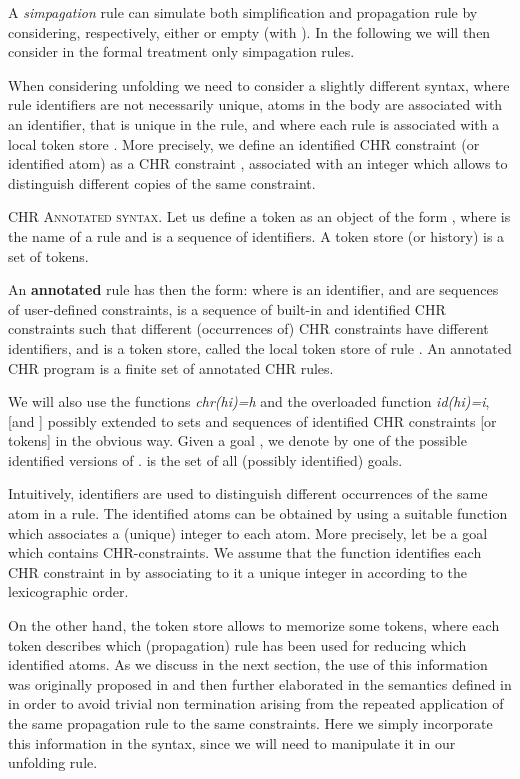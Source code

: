 \documentclass[final]{acmtrans2e}
\begin{document}
A  \emph{simpagation} rule can simulate both simplification and
propagation rule by considering, respectively, either  or
 empty (with ). In the following we
will then consider in the formal treatment only simpagation rules.

When considering unfolding we need to consider a slightly
different syntax,  where rule identifiers are not necessarily
unique, atoms in the body are associated with an identifier,
that is unique in the rule, and
where each rule is associated  with a local token store .
More precisely, we define an identified CHR constraint  (or
identified atom)  as a CHR constraint , associated with
an integer  which allows to distinguish different copies of the
same constraint.

\begin{definition}\textsc{CHR Annotated syntax.}
Let us define a token as an object of the form , where 
is the name of a rule and  is a sequence of identifiers.
A token store (or history) is a set of tokens.


\noindent An \textbf{annotated} rule has then the form:
 where 
is an identifier,  and  are
sequences of user-defined constraints, 
is a sequence of built-in and identified CHR constraints
such that different (occurrences of) CHR constraints have different identifiers,
and  is a token store, called the local token store of rule .
An annotated CHR program is a finite set of annotated CHR rules.
\end{definition}
We will also use the functions {\em chr(hi)=h} and the overloaded
function {\em id(hi)=i}, [and ]
possibly extended to sets and sequences of identified CHR constraints [or tokens] in
the obvious way. Given a goal , we denote by  one of the
possible identified versions of .  is the set of all (possibly
identified) goals.


Intuitively, identifiers are used to distinguish different
occurrences of the same atom in a rule. The identified atoms can
be obtained by using a suitable function which associates a
(unique) integer to each atom. More precisely, let  be a goal
which contains  CHR-constraints. We assume that the function
 identifies each CHR constraint in  by
associating to it a unique integer in  according to the
lexicographic order.

On the other hand, the token store allows to memorize  some tokens,
where each token describes which (propagation) rule has been used
for reducing which identified atoms.
As we discuss
in the next section, the use of this information was originally proposed
in \cite{Abd97} and then further elaborated in the semantics defined
in \cite{DSGH04} in order to avoid trivial  non termination
arising from the repeated application of the same propagation rule
to the same constraints. Here we simply incorporate this
information in the syntax, since we will need to manipulate it in
our unfolding rule.
\end{document}
